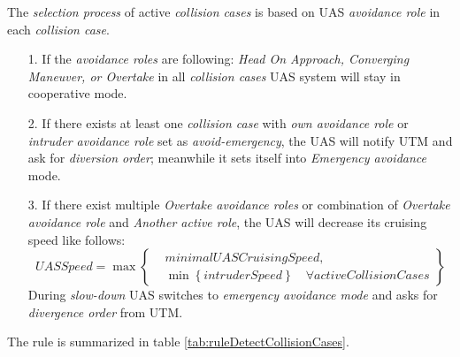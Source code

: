 The \emph{selection process} of active \emph{collision cases} is based on UAS \emph{avoidance role} in each \emph{collision case}.
\begin{itemize}
    \item[1.] If the \emph{avoidance roles} are following: \emph{Head On Approach, Converging Maneuver, or Overtake} in all \emph{collision cases} UAS system will stay in cooperative mode.
    \item[2.] If there exists at least one \emph{collision case} with \emph{own avoidance role} or \emph{intruder avoidance role} set as \emph{avoid-emergency}, the UAS will notify UTM and ask for \emph{diversion order}; meanwhile it sets itself into \emph{Emergency avoidance} mode.
    \item[3.] If there exist multiple \emph{Overtake avoidance roles} or combination of \emph{Overtake avoidance role} and \emph{Another active role}, the UAS will decrease its cruising speed like follows:
    \begin{equation}
        UASSpeed = \max \left\{\begin{aligned}
        & minimalUASCruisingSpeed,\\
        &\min \left\{intruderSpeed\right\}\quad \forall activeCollisionCases
        \end{aligned}
        \right\}
    \end{equation}
    During \emph{slow-down} UAS switches to \emph{emergency avoidance mode} and asks for \emph{divergence order} from UTM.
\end{itemize}

\newpage
\noindent The rule is summarized in table \ref{tab:ruleDetectCollisionCases}.

